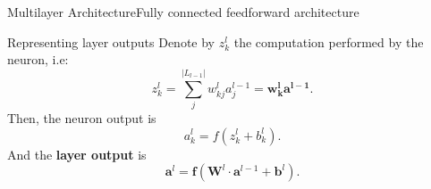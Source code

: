 \documentclass{beamer}
\begin{document}
        \begin{frame}{Multilayer Architecture}{Fully connected feedforward architecture}
            \begin{block}{Representing layer outputs}
                Denote by $z^l_k$
                the computation performed by the neuron, i.e:
                \[
                    z^l_k = \sum_j^{|L_{l-1}|} w^l_{kj}a^{l-1}_{j} = \mathbf{w^l_k}\mathbf{a^{l-1}}.
                \]
                Then, the neuron output is
                \[
                    a^l_k = f(z^l_k + b^l_k).
                \]
                And the \textbf{layer output} is
                \[
                    \mathbf{a}^l = \mathbf{f}(\mathbf{W}^l \cdot \mathbf{a}^{l-1} + \mathbf{b}^l).
                \]
            \end{block}
        \end{frame}
\end{document}
